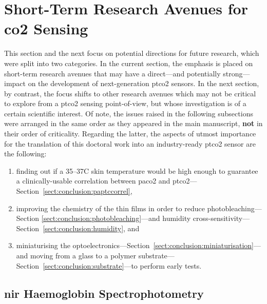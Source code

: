 \section{Short-Term Research Avenues for \texorpdfstring{\gls{co2}}{CO2} Sensing}\label{sect:conclusion:short_term}

This section and the next focus on potential directions for future research, which were split into two categories. In the current section, the emphasis is placed on short-term research avenues that may have a direct---and potentially strong---impact on the development of next-generation \gls{ptco2} sensors. In the next section, by contrast, the focus shifts to other research avenues which may not be critical to explore from a \gls{ptco2} sensing point-of-view, but whose investigation is of a certain scientific interest. Of note, the issues raised in the following subsections were arranged in the same order as they appeared in the main manuscript, \textbf{not} in their order of criticality. Regarding the latter, the aspects of utmost importance for the translation of this doctoral work into an industry-ready \gls{ptco2} sensor are the following:
\begin{enumerate}
	\item finding out if a 35--37{\degree}C skin temperature would be high enough to guarantee a clinically-usable correlation between \gls{paco2} and \gls{ptco2}---Section~\ref{sect:conclusion:paptccorrel},
	\item improving the chemistry of the thin films in order to reduce photobleaching---Section \ref{sect:conclusion:photobleaching}---and humidity cross-sensitivity---Section~\ref{sect:conclusion:humidity}, and
	\item miniaturising the optoelectronics---Section~\ref{sect:conclusion:miniaturisation}---and moving from a glass to a polymer substrate---Section~\ref{sect:conclusion:substrate}---to perform early \invivo{} tests.
\end{enumerate}

\subsection{\texorpdfstring{\gls{nir}}{NIR} Haemoglobin Spectrophotometry}

